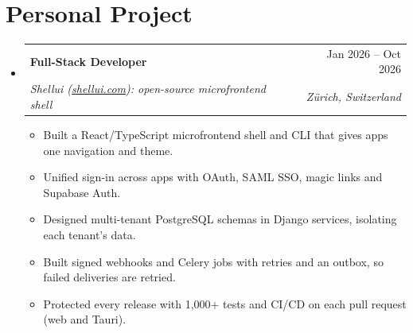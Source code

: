 \documentclass[a4paper,11pt]{article}
\makeatletter
\newcommand{\resumeItem}[1]{
  \item\normalsize{
    {#1}
  }
}
\newcommand{\resumeSubheading}[4]{
  \vspace{4pt}\item
    \begin{tabular*}{0.97\textwidth}[t]{l@{\extracolsep{\fill}}r}
      \textbf{#1} & #2 \\
      \textit{\small#3} & \textit{\small #4} \\
    \end{tabular*}\vspace{0pt}
}
\newcommand{\resumeSubHeadingListStart}{\begin{itemize}[leftmargin=0.15in, label={}]}
\newcommand{\resumeSubHeadingListEnd}{\end{itemize}}
\newcommand{\resumeItemListStart}{\begin{itemize}}
\newcommand{\resumeItemListEnd}{\end{itemize}\vspace{2pt}}
\makeatother
\begin{document}
\section{Personal Project}\resumeSubHeadingListStart
\resumeSubheading{Full-Stack Developer}{Jan 2026 -- Oct 2026}{Shellui (\href{https://shellui.com}{shellui.com}): open-source microfrontend shell}{Zürich, Switzerland}
\resumeItemListStart
\resumeItem{Built a React/TypeScript microfrontend shell and CLI that gives apps one navigation and theme.}
\resumeItem{Unified sign-in across apps with OAuth, SAML SSO, magic links and Supabase Auth.}
\resumeItem{Designed multi-tenant PostgreSQL schemas in Django services, isolating each tenant's data.}
\resumeItem{Built signed webhooks and Celery jobs with retries and an outbox, so failed deliveries are retried.}
\resumeItem{Protected every release with 1,000+ tests and CI/CD on each pull request (web and Tauri).}
\resumeItemListEnd
\resumeSubHeadingListEnd
\end{document}
